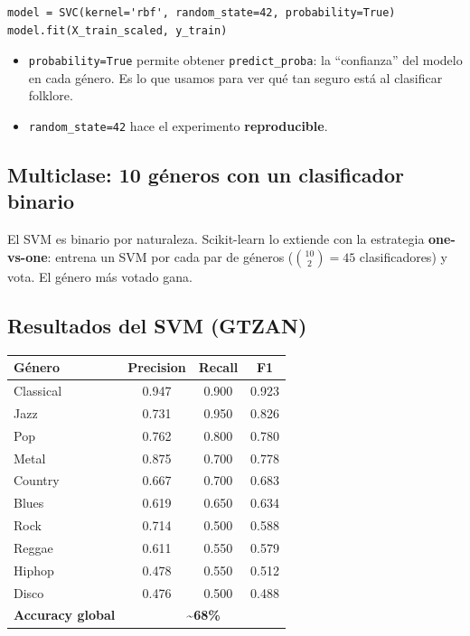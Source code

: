 \documentclass[11pt,a4paper]{article}
\begin{document}
\begin{lstlisting}
model = SVC(kernel='rbf', random_state=42, probability=True)
model.fit(X_train_scaled, y_train)
\end{lstlisting}

\begin{itemize}[leftmargin=0.7cm]
  \item \texttt{probability=True} permite obtener \texttt{predict\_proba}: la
  ``confianza'' del modelo en cada género. Es lo que usamos para ver qué tan
  seguro está al clasificar folklore.
  \item \texttt{random\_state=42} hace el experimento \textbf{reproducible}.
\end{itemize}

\subsection{Multiclase: 10 géneros con un clasificador binario}

El SVM es binario por naturaleza. Scikit-learn lo extiende con la estrategia
\textbf{one-vs-one}: entrena un SVM por cada par de géneros
($\binom{10}{2}=45$ clasificadores) y vota. El género más votado gana.

\subsection{Resultados del SVM (GTZAN)}

\begin{center}
\begin{tabular}{l c c c}
\toprule
\textbf{Género} & \textbf{Precision} & \textbf{Recall} & \textbf{F1} \\
\midrule
Classical & 0.947 & 0.900 & 0.923 \\
Jazz      & 0.731 & 0.950 & 0.826 \\
Pop       & 0.762 & 0.800 & 0.780 \\
Metal     & 0.875 & 0.700 & 0.778 \\
Country   & 0.667 & 0.700 & 0.683 \\
Blues     & 0.619 & 0.650 & 0.634 \\
Rock      & 0.714 & 0.500 & 0.588 \\
Reggae    & 0.611 & 0.550 & 0.579 \\
Hiphop    & 0.478 & 0.550 & 0.512 \\
Disco     & 0.476 & 0.500 & 0.488 \\
\midrule
\textbf{Accuracy global} & \multicolumn{3}{c}{\textbf{\textasciitilde 68\%}} \\
\bottomrule
\end{tabular}
\end{center}
\end{document}
